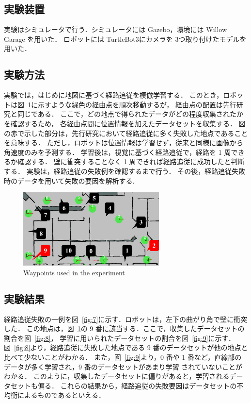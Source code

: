 \documentclass{jarticle}
\renewcommand{\figurename}{図~}
\newcommand{\figref}[1]{\figurename\ref{#1}}
\begin{document}
\subsection{実験装置}
実験はシミュレータで行う．シミュレータには Gazebo\cite{gazebo}，環境には Willow Garage を用いた．
ロボットには TurtleBot3\cite{TurtleBot3}にカメラを 3つ取り付けたモデルを用いた．

\subsection{実験方法}
実験では，はじめに地図に基づく経路追従を模倣学習する．
このとき，ロボットは\figref{fig:6}に示すような緑色の経由点を順次移動するが，
経由点の配置は先行研究と同じである．
ここで，どの地点で得られたデータがどの程度収集されたかを確認するため，
各経由点間に位置情報を加えたデータセットを収集する．
図の赤で示した部分は，先行研究において経路追従に多く失敗した地点であることを意味する．
ただし，ロボットは位置情報は学習せず，従来と同様に画像から角速度のみを予測する．
学習後は，視覚に基づく経路追従で，経路を 1 周できるか確認する．
壁に衝突することなく 1 周できれば経路追従に成功したと判断する．
実験は，経路追従の失敗例を確認するまで行う．
その後，経路追従失敗時のデータを用いて失敗の要因を解析する.

\begin{figure}[h!]
  \centering
   \includegraphics[height=40mm]{./png/location.png}
   \caption{Waypoints used in the experiment}
   \label{fig:6}
\end{figure}

\subsection{実験結果}
経路追従失敗の一例を\figref{fig:7}に示す．ロボットは，左下の曲がり角で壁に衝突した．
この地点は，\figref{fig:6}の 9 番に該当する．ここで，収集したデータセットの割合を\figref{fig:8}，
学習に用いられたデータセットの割合を\figref{fig:9}に示す．
\figref{fig:8}より，経路追従に失敗した地点である 9 番のデータセットが他の地点と比べて少ないことがわかる．
また，\figref{fig:9}より，0 番や 1 番など，直線部のデータが多く学習され，9 番のデータセットがあまり学習
されていないことがわかる．
このように，収集したデータセットに偏りがあると，学習されるデータセットも偏る．
これらの結果から，経路追従の失敗要因はデータセットの不均衡によるものであるといえる．
\end{document}
